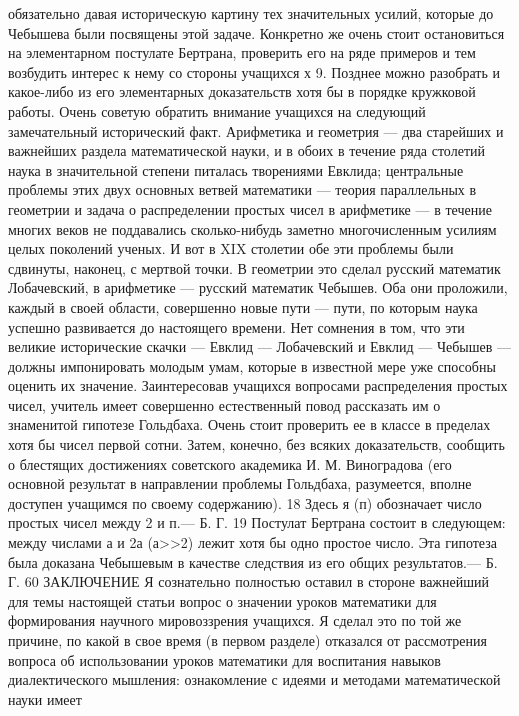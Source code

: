 \documentclass[12pt, a4paper, openany]{book}
\begin{document}
обязательно давая историческую картину тех значительных 
усилий, которые до Чебышева были посвящены этой  
задаче. Конкретно же очень стоит остановиться на  
элементарном постулате Бертрана, проверить его на ряде примеров 
и тем возбудить интерес к нему со стороны учащихся х 9. 
Позднее можно разобрать и какое-либо из его  
элементарных доказательств хотя бы в порядке кружковой работы. 
Очень советую обратить внимание учащихся на  
следующий замечательный исторический факт. Арифметика и 
геометрия — два старейших и важнейших раздела  
математической науки, и в обоих в течение ряда столетий 
наука в значительной степени питалась творениями  
Евклида; центральные проблемы этих двух основных ветвей 
математики — теория параллельных в геометрии и задача 
о распределении простых чисел в арифметике — в течение 
многих веков не поддавались сколько-нибудь заметно 
многочисленным усилиям целых поколений ученых. И вот 
в XIX столетии обе эти проблемы были сдвинуты,  
наконец, с мертвой точки. В геометрии это сделал русский 
математик Лобачевский, в арифметике — русский  
математик Чебышев. Оба они проложили, каждый в своей 
области, совершенно новые пути — пути, по которым  
наука успешно развивается до настоящего времени. Нет 
сомнения в том, что эти великие исторические скачки — 
Евклид — Лобачевский и Евклид — Чебышев — должны 
импонировать молодым умам, которые в известной мере 
уже способны оценить их значение. 
Заинтересовав учащихся вопросами распределения 
простых чисел, учитель имеет совершенно естественный 
повод рассказать им о знаменитой гипотезе Гольдбаха. 
Очень стоит проверить ее в классе в пределах хотя бы  
чисел первой сотни. Затем, конечно, без всяких  
доказательств, сообщить о блестящих достижениях советского 
академика И. М. Виноградова (его основной результат 
в направлении проблемы Гольдбаха, разумеется, вполне 
доступен учащимся по своему содержанию). 
18 Здесь я (п) обозначает число простых чисел между 2 и п.— 
Б. Г. 
19 Постулат Бертрана состоит в следующем: между числами 
а и 2а (а>>2) лежит хотя бы одно простое число. Эта гипотеза была 
доказана Чебышевым в качестве следствия из его общих  
результатов.— Б. Г. 
60 
ЗАКЛЮЧЕНИЕ 
Я сознательно полностью оставил в стороне важнейший 
для темы настоящей статьи вопрос о значении уроков 
математики для формирования научного мировоззрения 
учащихся. Я сделал это по той же причине, по какой в 
свое время (в первом разделе) отказался от рассмотрения 
вопроса об использовании уроков математики для  
воспитания навыков диалектического мышления: ознакомление 
с идеями и методами математической науки имеет  
\end{document}

